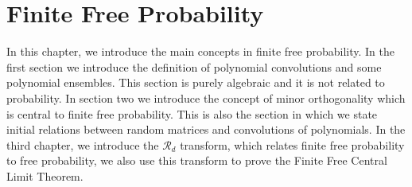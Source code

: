 \chapter{Finite Free Probability} \label{ch:finite_free}

In this chapter, we introduce the main concepts in finite free probability. In the first section we introduce the definition of polynomial convolutions and some polynomial ensembles. This section is purely algebraic and it is not related to probability. In section two we introduce the concept of minor orthogonality which is central to finite free probability. This is also the section in which we state initial relations between random matrices and convolutions of polynomials. In the third chapter, we introduce the $\mathcal R_d$ transform, which relates finite free probability to free probability, we also use this transform to prove the Finite Free Central Limit Theorem.



